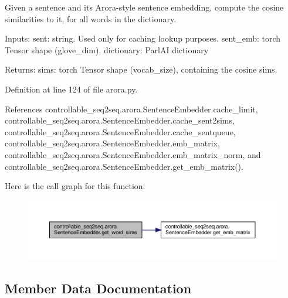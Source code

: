 \begin{DoxyVerb}Given a sentence and its Arora-style sentence embedding, compute the cosine
similarities to it, for all words in the dictionary.

Inputs:
  sent: string. Used only for caching lookup purposes.
  sent_emb: torch Tensor shape (glove_dim).
  dictionary: ParlAI dictionary

Returns:
  sims: torch Tensor shape (vocab_size), containing the cosine sims.
\end{DoxyVerb}
 

Definition at line 124 of file arora.\+py.



References controllable\+\_\+seq2seq.\+arora.\+Sentence\+Embedder.\+cache\+\_\+limit, controllable\+\_\+seq2seq.\+arora.\+Sentence\+Embedder.\+cache\+\_\+sent2sims, controllable\+\_\+seq2seq.\+arora.\+Sentence\+Embedder.\+cache\+\_\+sentqueue, controllable\+\_\+seq2seq.\+arora.\+Sentence\+Embedder.\+emb\+\_\+matrix, controllable\+\_\+seq2seq.\+arora.\+Sentence\+Embedder.\+emb\+\_\+matrix\+\_\+norm, and controllable\+\_\+seq2seq.\+arora.\+Sentence\+Embedder.\+get\+\_\+emb\+\_\+matrix().

Here is the call graph for this function\+:
\nopagebreak
\begin{figure}[H]
\begin{center}
\leavevmode
\includegraphics[width=350pt]{classcontrollable__seq2seq_1_1arora_1_1SentenceEmbedder_ab01f3112c0765e2c7f9da902386ac865_cgraph}
\end{center}
\end{figure}


\subsection{Member Data Documentation}
\mbox{\label{classcontrollable__seq2seq_1_1arora_1_1SentenceEmbedder_a14187c96a59bc562fa4749498608eed1}} 
